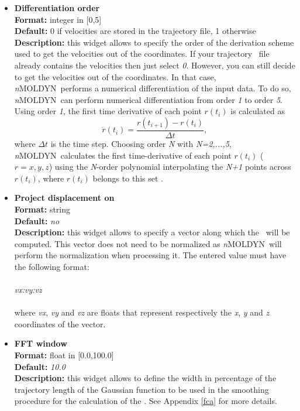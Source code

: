 \documentclass[a4paper,11pt]{report}
\newcommand{\NMOLDYN}{\textit{n}MOLDYN}
\begin{document}
\begin{itemize}
\hypertarget{dos_differentiation_order}{}
\item \textbf{Differentiation order}\\
\textbf{Format:} integer in [0,5]\\
\textbf{Default:} 0 if velocities are stored in the trajectory file, 1 otherwise\\
\textbf{Description:} this widget allows to specify the order of the derivation scheme used to get the velocities out 
of the coordinates. If your trajectory \NetCDF\ file already contains the velocities then just select \textit{0}.
However, you can still decide to get the velocities out of the coordinates. In that case, \NMOLDYN\ performs a numerical 
differentiation of the input data. To do so, \NMOLDYN\ can perform numerical differentiation from order \textit{1} to 
order \textit{5}. Using order \textit{1}, the first time derivative of each point $r(t_i)$ 
is calculated as
\begin{equation}
\dot{r}(t_i)=\frac{r(t_{i+1})-r(t_{i})} {\Delta t},
\end{equation}
where $\Delta t$ is the time step. 
Choosing order \textit{N} with \textit{N=2,...,5}, \NMOLDYN\ calculates the first time-derivative of each point 
$r(t_i)$ ($r=x,y,z$) using the \textit{N}-order polynomial interpolating the \textit{N+1} points across $r(t_i)$, where $r(t_i)$ 
belongs to this set \cite{Abramowitz}.

\hypertarget{dos_project_displacement_on}{}
\item \textbf{Project displacement on}\\
\textbf{Format:} string\\
\textbf{Default:} \textit{no}\\
\textbf{Description:} this widget allows to specify a vector along which the \DOS\ will be computed. This vector does not 
need to be normalized as \NMOLDYN\ will perform the normalization when processing it. The entered value must have the 
following format:
\\\\
\textit{vx:vy:vz}
\\\\
where \textit{vx}, \textit{vy} and \textit{vz} are floats that represent respectively the \textit{x}, \textit{y} and \textit{z} coordinates of the vector.

\hypertarget{dos_fft_window}{}
\item \textbf{FFT window}\\
\textbf{Format:} float in [0.0,100.0]\\
\textbf{Default:} \textit{10.0}\\
\textbf{Description:} this widget allows to define the width in percentage of the trajectory length of the Gaussian 
function to be used in the smoothing procedure for the calculation of the \DOS. See Appendix \ref{fca} for more details.


\end{itemize}
\end{document}
